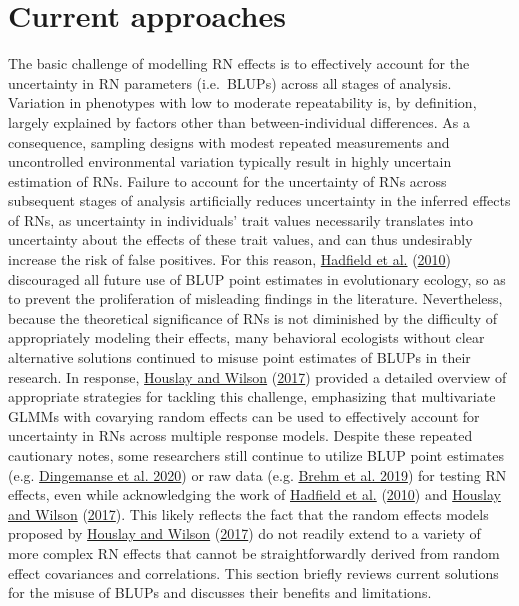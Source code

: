 \documentclass{article}
\begin{document}
\hypertarget{current-approaches}{%
\section{Current approaches}\label{current-approaches}}

The basic challenge of modelling RN effects is to effectively account
for the uncertainty in RN parameters (i.e.~BLUPs) across all stages of
analysis. Variation in phenotypes with low to moderate repeatability is,
by definition, largely explained by factors other than
between-individual differences. As a consequence, sampling designs with
modest repeated measurements and uncontrolled environmental variation
typically result in highly uncertain estimation of RNs. Failure to
account for the uncertainty of RNs across subsequent stages of analysis
artificially reduces uncertainty in the inferred effects of RNs, as
uncertainty in individuals' trait values necessarily translates into
uncertainty about the effects of these trait values, and can thus
undesirably increase the risk of false positives. For this reason,
\protect\hyperlink{ref-Hadfield2010}{Hadfield et al.}
(\protect\hyperlink{ref-Hadfield2010}{2010}) discouraged all future use
of BLUP point estimates in evolutionary ecology, so as to prevent the
proliferation of misleading findings in the literature. Nevertheless,
because the theoretical significance of RNs is not diminished by the
difficulty of appropriately modeling their effects, many behavioral
ecologists without clear alternative solutions continued to misuse point
estimates of BLUPs in their research. In response,
\protect\hyperlink{ref-Hous2017}{Houslay and Wilson}
(\protect\hyperlink{ref-Hous2017}{2017}) provided a detailed overview of
appropriate strategies for tackling this challenge, emphasizing that
multivariate GLMMs with covarying random effects can be used to
effectively account for uncertainty in RNs across multiple response
models. Despite these repeated cautionary notes, some researchers still
continue to utilize BLUP point estimates (e.g.
\protect\hyperlink{ref-Ding2020b}{Dingemanse et al. 2020}) or raw data
(e.g. \protect\hyperlink{ref-Brehm2019}{Brehm et al. 2019}) for testing
RN effects, even while acknowledging the work of
\protect\hyperlink{ref-Hadfield2010}{Hadfield et al.}
(\protect\hyperlink{ref-Hadfield2010}{2010}) and
\protect\hyperlink{ref-Hous2017}{Houslay and Wilson}
(\protect\hyperlink{ref-Hous2017}{2017}). This likely reflects the fact
that the random effects models proposed by
\protect\hyperlink{ref-Hous2017}{Houslay and Wilson}
(\protect\hyperlink{ref-Hous2017}{2017}) do not readily extend to a
variety of more complex RN effects that cannot be straightforwardly
derived from random effect covariances and correlations. This section
briefly reviews current solutions for the misuse of BLUPs and discusses
their benefits and limitations.
\end{document}
